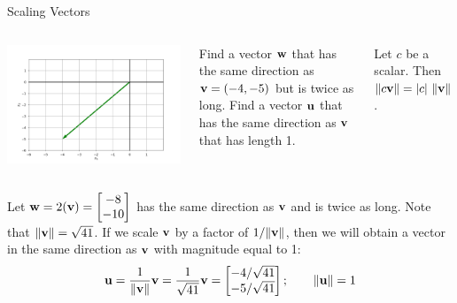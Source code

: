 \documentclass[xcolor=dvipsnames,aspectratio=169,t]{beamer}
\begin{document}
\begin{frame}{Scaling Vectors}

\begin{columns}[T]

\column{0.3\tw}

\includegraphics[width=0.95\tw]{images/fig-dist1.png}

\column{0.7\tw}

\bb
\ii Find a vector $\mathbf{w}$ that has the same direction as $\mathbf{v}=(-4,-5)$ but is twice as long.
\ii Find a vector $\mathbf{u}$ that has the same direction as $\mathbf{v}$ that has length 1.
\ee

\pause
\bbox
Let $c$ be a scalar. Then $\| c \mathbf{v} \|= |c|\ \| \mathbf{v} \|$. 
\ebox
\end{columns}

\pause
\bb
\ii Let $\mathbf{w} = 2(\mathbf{v}) = \begin{bmatrix} -8 \\ -10 \end{bmatrix}$ has the same direction as $\mathbf{v}$ and is twice as long.
\ii Note that $\|\mathbf{v}\| = \sqrt{41}$. If we scale $\mathbf{v}$ by a factor of $1/\| \mathbf{v} \|$, then we will obtain a vector in the same direction as $\mathbf{v}$ with magnitude equal to 1:
\[ \mathbf{u} = \frac{1}{\|\mathbf{v}\|} \mathbf{v} = \frac{1}{\sqrt{41}} \mathbf{v} = \begin{bmatrix} -4/\sqrt{41} \\ -5/\sqrt{41} \end{bmatrix}; \qquad \|\mathbf{u}\| = 1 \]
\ee

\end{frame}
\end{document}
